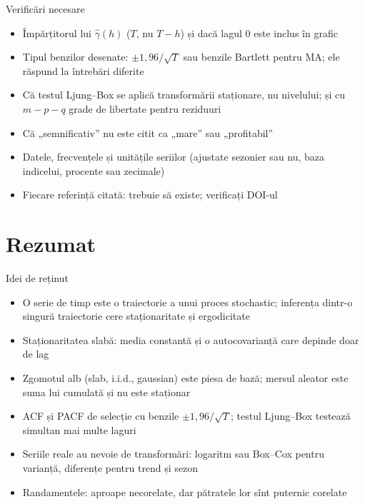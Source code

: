 \begin{frame}{Verificări necesare}
\itemsize{\small}
\begin{itemize}
    \item Împărțitorul lui $\hat\gamma(h)$ ($T$, nu $T - h$) și dacă lagul 0 este inclus în grafic
    \item Tipul benzilor desenate: $\pm 1{,}96/\sqrt{T}$ sau benzile Bartlett pentru MA; ele răspund la întrebări diferite
    \item Că testul Ljung--Box se aplică transformării staționare, nu nivelului; și cu $m - p - q$ grade de libertate pentru reziduuri
    \item Că „semnificativ” nu este citit ca „mare” sau „profitabil”
    \item Datele, frecvențele și unitățile seriilor (ajustate sezonier sau nu, baza indicelui, procente sau zecimale)
    \item Fiecare referință citată: trebuie să existe; verificați DOI-ul
\end{itemize}
\end{frame}


\section{Rezumat}

\begin{frame}{Idei de reținut}
\itemsize{\small}
\begin{itemize}
    \item O serie de timp este o traiectorie a unui proces stochastic; inferența dintr-o singură traiectorie cere staționaritate și ergodicitate
    \item Staționaritatea slabă: media constantă și o autocovarianță care depinde doar de lag
    \item Zgomotul alb (slab, i.i.d., gaussian) este piesa de bază; mersul aleator este suma lui cumulată și nu este staționar
    \item ACF și PACF de selecție cu benzile $\pm 1{,}96/\sqrt{T}$; testul Ljung--Box testează simultan mai multe laguri
    \item Seriile reale au nevoie de transformări: logaritm sau Box--Cox pentru varianță, diferențe pentru trend și sezon
    \item Randamentele: aproape necorelate, dar pătratele lor sînt puternic corelate
\end{itemize}
\end{frame}

